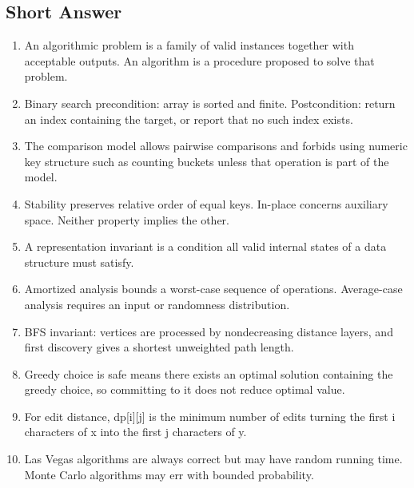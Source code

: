\documentclass[11pt]{ctexart}
\begin{document}
\subsection*{Short Answer}
\begin{enumerate}
  \item An algorithmic problem is a family of valid instances together with acceptable outputs. An algorithm is a procedure proposed to solve that problem.
  \item Binary search precondition: array is sorted and finite. Postcondition: return an index containing the target, or report that no such index exists.
  \item The comparison model allows pairwise comparisons and forbids using numeric key structure such as counting buckets unless that operation is part of the model.
  \item Stability preserves relative order of equal keys. In-place concerns auxiliary space. Neither property implies the other.
  \item A representation invariant is a condition all valid internal states of a data structure must satisfy.
  \item Amortized analysis bounds a worst-case sequence of operations. Average-case analysis requires an input or randomness distribution.
  \item BFS invariant: vertices are processed by nondecreasing distance layers, and first discovery gives a shortest unweighted path length.
  \item Greedy choice is safe means there exists an optimal solution containing the greedy choice, so committing to it does not reduce optimal value.
  \item For edit distance, dp[i][j] is the minimum number of edits turning the first i characters of x into the first j characters of y.
  \item Las Vegas algorithms are always correct but may have random running time. Monte Carlo algorithms may err with bounded probability.
\end{enumerate}
\end{document}
